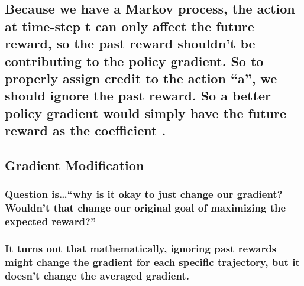 \documentclass[11pt]{article}
\begin{document}
    \hypertarget{because-we-have-a-markov-process-the-action-at-time-step-t-can-only-affect-the-future-reward-so-the-past-reward-shouldnt-be-contributing-to-the-policy-gradient.-so-to-properly-assign-credit-to-the-action-a-we-should-ignore-the-past-reward.-so-a-better-policy-gradient-would-simply-have-the-future-reward-as-the-coefficient-.}{%
\subsection{Because we have a Markov process, the action at time-step t
can only affect the future reward, so the past reward shouldn't be
contributing to the policy gradient. So to properly assign credit to the
action ``a'', we should ignore the past reward. So a better policy
gradient would simply have the future reward as the coefficient
.}\label{because-we-have-a-markov-process-the-action-at-time-step-t-can-only-affect-the-future-reward-so-the-past-reward-shouldnt-be-contributing-to-the-policy-gradient.-so-to-properly-assign-credit-to-the-action-a-we-should-ignore-the-past-reward.-so-a-better-policy-gradient-would-simply-have-the-future-reward-as-the-coefficient-.}}

    \hypertarget{gradient-modification}{%
\subsection{Gradient Modification}\label{gradient-modification}}

\hypertarget{question-iswhy-is-it-okay-to-just-change-our-gradient-wouldnt-that-change-our-original-goal-of-maximizing-the-expected-reward}{%
\subsubsection{Question is\ldots{}``why is it okay to just change our
gradient? Wouldn't that change our original goal of maximizing the
expected
reward?''}\label{question-iswhy-is-it-okay-to-just-change-our-gradient-wouldnt-that-change-our-original-goal-of-maximizing-the-expected-reward}}

\hypertarget{it-turns-out-that-mathematically-ignoring-past-rewards-might-change-the-gradient-for-each-specific-trajectory-but-it-doesnt-change-the-averaged-gradient.}{%
\subsubsection{It turns out that mathematically, ignoring past rewards
might change the gradient for each specific trajectory, but it doesn't
change the averaged
gradient.}\label{it-turns-out-that-mathematically-ignoring-past-rewards-might-change-the-gradient-for-each-specific-trajectory-but-it-doesnt-change-the-averaged-gradient.}}
\end{document}
